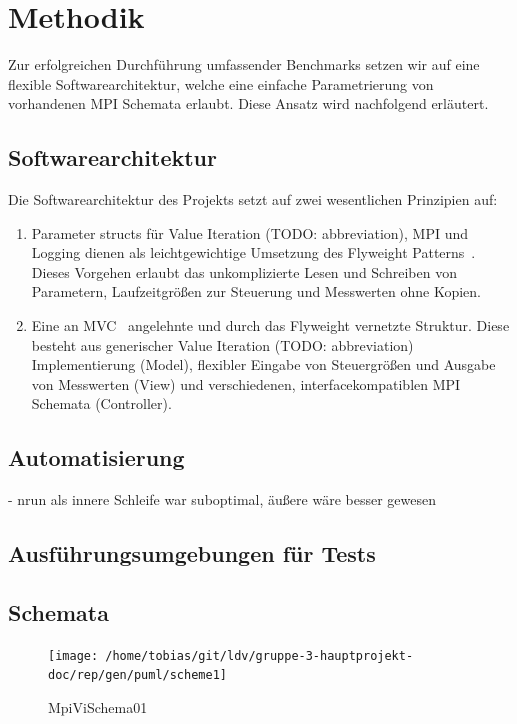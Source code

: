 \section{Methodik}
\label{sec:methodik}

Zur erfolgreichen Durchführung umfassender Benchmarks setzen wir auf eine flexible Softwarearchitektur, welche eine einfache Parametrierung von vorhandenen MPI Schemata erlaubt. Diese Ansatz wird nachfolgend erläutert.

\subsection{Softwarearchitektur}
Die Softwarearchitektur des Projekts setzt auf zwei wesentlichen Prinzipien auf:
\begin{enumerate}
	\item Parameter structs für Value Iteration (TODO: abbreviation), MPI und Logging dienen als leichtgewichtige Umsetzung des Flyweight Patterns~\citep[S.195ff.]{gamma1995design}. Dieses Vorgehen erlaubt das unkomplizierte Lesen und Schreiben von Parametern, Laufzeitgrößen zur Steuerung und Messwerten ohne Kopien.
	\item Eine an MVC~\citep[S.125ff.]{buschmann1996pattern-oriented} angelehnte und durch das Flyweight vernetzte Struktur. Diese besteht aus generischer Value Iteration (TODO: abbreviation) Implementierung (Model), flexibler Eingabe von Steuergrößen und Ausgabe von Messwerten (View) und verschiedenen, interfacekompatiblen MPI Schemata (Controller).
\end{enumerate}

\subsection{Automatisierung}
- nrun als innere Schleife war suboptimal, äußere wäre besser gewesen

\subsection{Ausführungsumgebungen für Tests}

\subsection{Schemata}

\begin{figure}[h]
	\centering
	\texttt{[image: /home/tobias/git/ldv/gruppe-3-hauptprojekt-doc/rep/gen/puml/scheme1]}
	\caption{MpiViSchema01}
	\label{fig:mpiViSchema01}
\end{figure}

